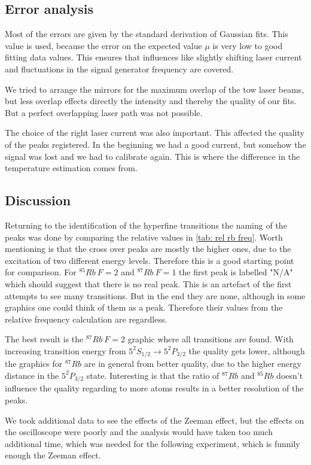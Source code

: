 \documentclass[]{article}
\begin{document}
\subsection{Error analysis}
Most of the errors are given by the standard derivation of Gaussian fits. This value is used, because the error on the expected value $\mu$ is very low to good fitting data values. This ensures that influences like slightly shifting laser current and fluctuations in the signal generator frequency are covered.

We tried to arrange the mirrors for the maximum overlap of the tow laser beams, but less overlap effects directly the intensity and thereby the quality of our fits. But a perfect overlapping laser path was not possible.

The choice of the right laser current was also important. This affected the quality of the peaks registered. In the beginning we had a good current, but somehow the signal was lost and we had to calibrate again. This is where the difference in the temperature estimation comes from.


\subsection{Discussion}
Returning to the identification of the hyperfine transitions the naming of the peaks was done by comparing the relative values in \autoref{tab: rel rb freq}. Worth mentioning is that the cross over peaks are mostly the higher ones, due to the excitation of two different energy levels. Therefore this is a good starting point for comparison. For $^{85}Rb\ F=2$ and $^{87}Rb\ F=1$ the first peak is labelled "N/A" which should suggest that there is no real peak. This is an artefact of the first attempts to see many transitions. But in the end they are none, although in some graphics one could think of them as a peak. Therefore their values from the relative frequency calculation are regardless.

The best result is the $^{87}Rb\ F=2$ graphic where all transitions are found. With increasing transition energy from $5^2S_{1/2} \rightarrow 5^2P_{3/2}$ the quality gets lower, although the graphics for $^{87}Rb$ are in general from better quality, due to the higher energy distance in the $5^2P_{3/2}$ state. Interesting is that the ratio of $^{87}Rb$ and $^{85}Rb$ doesn't influence the quality regarding to more atoms results in a better resolution of the peaks.

We took additional data to see the effects of the Zeeman effect, but the effects on the oscilloscope were poorly and the analysis would have taken too much additional time, which was needed for the following experiment, which is funnily enough the Zeeman effect.
\end{document}
